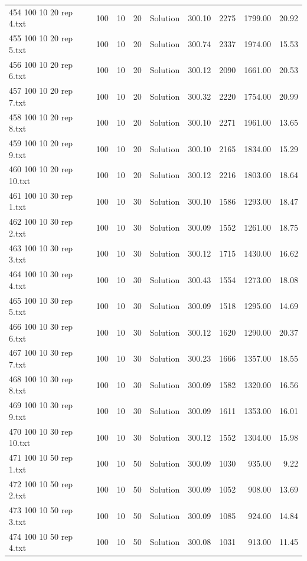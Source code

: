 \begin{longtable}{lrrllrrrr}
454 100 10 20 rep 4.txt & 100 & 10 & 20 & Solution & 300.10 & 2275 & 1799.00 & 20.92\\
455 100 10 20 rep 5.txt & 100 & 10 & 20 & Solution & 300.74 & 2337 & 1974.00 & 15.53\\
456 100 10 20 rep 6.txt & 100 & 10 & 20 & Solution & 300.12 & 2090 & 1661.00 & 20.53\\
457 100 10 20 rep 7.txt & 100 & 10 & 20 & Solution & 300.32 & 2220 & 1754.00 & 20.99\\
458 100 10 20 rep 8.txt & 100 & 10 & 20 & Solution & 300.10 & 2271 & 1961.00 & 13.65\\
459 100 10 20 rep 9.txt & 100 & 10 & 20 & Solution & 300.10 & 2165 & 1834.00 & 15.29\\
460 100 10 20 rep 10.txt & 100 & 10 & 20 & Solution & 300.12 & 2216 & 1803.00 & 18.64\\
461 100 10 30 rep 1.txt & 100 & 10 & 30 & Solution & 300.10 & 1586 & 1293.00 & 18.47\\
462 100 10 30 rep 2.txt & 100 & 10 & 30 & Solution & 300.09 & 1552 & 1261.00 & 18.75\\
463 100 10 30 rep 3.txt & 100 & 10 & 30 & Solution & 300.12 & 1715 & 1430.00 & 16.62\\
464 100 10 30 rep 4.txt & 100 & 10 & 30 & Solution & 300.43 & 1554 & 1273.00 & 18.08\\
465 100 10 30 rep 5.txt & 100 & 10 & 30 & Solution & 300.09 & 1518 & 1295.00 & 14.69\\
466 100 10 30 rep 6.txt & 100 & 10 & 30 & Solution & 300.12 & 1620 & 1290.00 & 20.37\\
467 100 10 30 rep 7.txt & 100 & 10 & 30 & Solution & 300.23 & 1666 & 1357.00 & 18.55\\
468 100 10 30 rep 8.txt & 100 & 10 & 30 & Solution & 300.09 & 1582 & 1320.00 & 16.56\\
469 100 10 30 rep 9.txt & 100 & 10 & 30 & Solution & 300.09 & 1611 & 1353.00 & 16.01\\
470 100 10 30 rep 10.txt & 100 & 10 & 30 & Solution & 300.12 & 1552 & 1304.00 & 15.98\\
471 100 10 50 rep 1.txt & 100 & 10 & 50 & Solution & 300.09 & 1030 & 935.00 &  9.22\\
472 100 10 50 rep 2.txt & 100 & 10 & 50 & Solution & 300.09 & 1052 & 908.00 & 13.69\\
473 100 10 50 rep 3.txt & 100 & 10 & 50 & Solution & 300.09 & 1085 & 924.00 & 14.84\\
474 100 10 50 rep 4.txt & 100 & 10 & 50 & Solution & 300.08 & 1031 & 913.00 & 11.45\\

\end{longtable}
